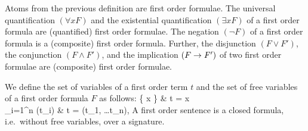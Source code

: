 
\begin{definition}\label{def:syntax:FOF}
	Atoms from the previous definition are {\myem first order formulae}.  
	The universal quantification $(\forall x F)$ 
	and the existential quantification $(\exists x F)$ 
	of a first order formula are (quantified) first order formulae.
	The negation $(\lnot F)$ of a first order formula
	is a (composite) first order formula.
	Further, the disjunction $(F \lor F')$, 
	the conjunction $(F \land F') $, 
	and the implication $(F \rightarrow F')$ 
	of two first order formulae
	are (composite) first order formulae.
\end{definition}

\begin{definition}\label{def:term:vars}\label{def:fof:fvars}\label{def:fof:sentence}
	We define the set of variables of a first order term $t$ and the set of {\myem free} variables of a first order formula $F$ as follows:
 {
		\{ x \} &  t = x \in \mcV \\
		\bigcup_{i=1}^n \var(t_i) &   t = \mf(t_1, \ldots t_n), \mf \in \mcFfn
	}
A first order {\myem sentence} is a closed formula, 
i.e.~without free variables, 
over a signature.
\end{definition}